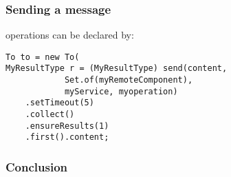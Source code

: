 \documentclass[11pt]{beamer}
\begin{document}
\begin{frame}[containsverbatim]
\frametitle{Sending a message}
operations can be declared by:
\begin{lstlisting}
To to = new To(
MyResultType r = (MyResultType) send(content,
			Set.of(myRemoteComponent),
			myService, myoperation)
	.setTimeout(5)
	.collect()
	.ensureResults(1)
	.first().content;
\end{lstlisting}
\end{frame}



\begin{frame}
\frametitle{Conclusion}
\end{frame}
\end{document}
